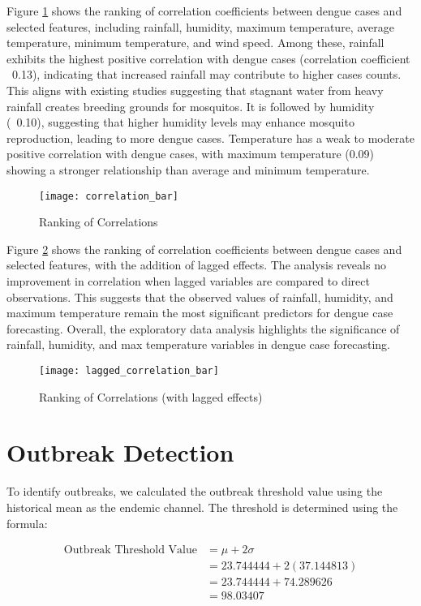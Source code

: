 Figure \ref{fig:correlation_bar} shows the ranking of correlation coefficients between dengue cases and selected features, including rainfall, humidity, maximum temperature, average temperature, minimum temperature, and wind speed. Among these, rainfall exhibits the highest positive correlation with dengue cases (correlation coefficient ~0.13), indicating that increased rainfall may contribute to higher cases counts. This aligns with existing studies suggesting that stagnant water from heavy rainfall creates breeding grounds for mosquitos. It is followed by humidity (~0.10), suggesting that higher humidity levels may enhance mosquito reproduction, leading to more dengue cases. Temperature has a weak to moderate positive correlation with dengue cases, with maximum temperature (0.09) showing a stronger relationship than average and minimum temperature. 

\begin{figure}[hbt!]
	\centering
	\texttt{[image: correlation\_bar]}
	\caption{Ranking of Correlations}
	\label{fig:correlation_bar}
\end{figure}

Figure \ref{fig:lagged_correlation_bar} shows the ranking of correlation coefficients between dengue cases and selected features, with the addition of lagged effects. The analysis reveals no improvement in correlation when lagged variables are compared to direct observations. This suggests that the observed values of rainfall, humidity, and maximum temperature remain the most significant predictors for dengue case forecasting. Overall, the exploratory data analysis highlights the significance of rainfall, humidity, and max temperature variables in dengue case forecasting.

\begin{figure}[h!]
	\centering
	\texttt{[image: lagged\_correlation\_bar]}
	\caption{Ranking of Correlations (with lagged effects)}
	\label{fig:lagged_correlation_bar}
\end{figure}

\section{Outbreak Detection}  
To identify outbreaks, we calculated the outbreak threshold value using the historical mean as the endemic channel. The threshold is determined using the formula:  

\begin{align}  
	\text{Outbreak Threshold Value} &= \mu + 2\sigma \\  
	&= 23.744444 + 2(37.144813) \\  
	&= 23.744444 + 74.289626 \\  
	&= 98.03407  
\end{align}  

